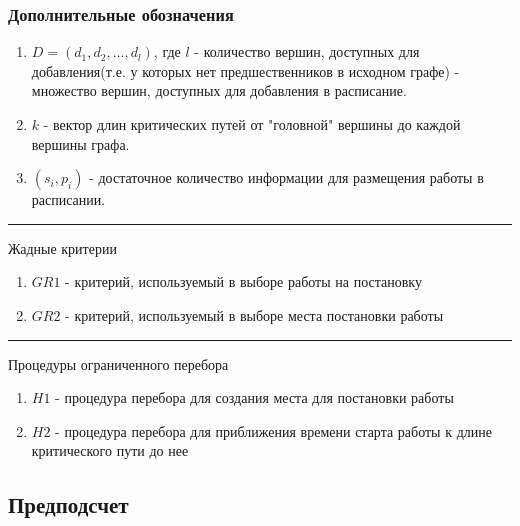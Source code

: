 \begin{frame}
    \frametitle{Дополнительные обозначения}
    \begin{enumerate}
        \item $D= \left( d_1, d_2, \dots, d_l \right)$, где $l$ - количество вершин, доступных для добавления(т.е. у которых нет предшественников в исходном графе) - множество вершин, доступных для добавления в расписание.
        \item $k$ - вектор длин критических путей от "головной" вершины до каждой вершины графа.
        \item $\left( s_i, p_i \right)$ - достаточное количество информации для размещения работы в расписании.
    \end{enumerate}
    \hrule
    \vspace{2pt}
    Жадные критерии
    \begin{enumerate}
        \item $GR1$ - критерий, используемый в выборе работы на постановку
        \item $GR2$ - критерий, используемый в выборе места постановки работы
    \end{enumerate}
    \hrule
    \vspace{2pt}
    Процедуры ограниченного перебора
    \begin{enumerate}
        \item $H1$ - процедура перебора для создания места для постановки работы
        \item $H2$ - процедура перебора для приближения времени старта работы к длине критического пути до нее
    \end{enumerate}
\end{frame}


\subsection{Предподсчет}


